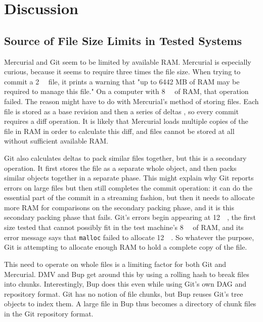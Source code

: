 \chapter{Discussion}


\section{Source of File Size Limits in Tested Systems}


Mercurial and Git seem to be limited by available RAM. Mercurial is especially
curious, because it seems to require three times the file size. When trying to
commit a \SI{2}{\gibi\byte} file, it prints a warning that "up to 6442 MB of RAM
may be required to manage this file." On a computer with \SI{8}{\gibi\byte} of
RAM, that operation failed. The reason might have to do with Mercurial's method
of storing files. Each file is stored as a base revision and then a series of
deltas \cite[Chapter 4]{hgbook}, so every commit requires a diff operation. It
is likely that Mercurial loads multiple copies of the file in RAM in order to
calculate this diff, and files cannot be stored at all without sufficient
available RAM.

Git also calculates deltas to pack similar files together, but this is a
secondary operation. It first stores the file as a separate whole object, and
then packs similar objects together in a separate phase. This might explain why
Git reports errors on large files but then still completes the commit operation:
it can do the essential part of the commit in a streaming fashion, but then it
needs to allocate more RAM for comparisons on the secondary packing phase, and
it is this secondary packing phase that fails. Git's errors begin appearing at
\SI{12}{\gibi\byte}, the first size tested that cannot possibly fit in the test
machine's \SI{8}{\gibi\byte} of RAM, and its error message says that
\lstinline{malloc} failed to allocate \SI{12}{\gibi\byte}. So whatever the
purpose, Git is attempting to allocate enough RAM to hold a complete copy of the
file.

This need to operate on whole files is a limiting factor for both Git and
Mercurial. DMV and Bup get around this by using a rolling hash to break files
into chunks. Interestingly, Bup does this even while using Git's own DAG and
repository format\cite{bup_design}. Git has no notion of file chunks, but Bup
reuses Git's tree objects to index them. A large file in Bup thus becomes a
directory of chunk files in the Git repository format.

